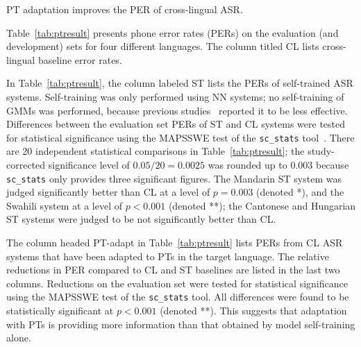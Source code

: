 
PT adaptation improves the PER of cross-lingual ASR.

Table~\ref{tab:ptresult} presents phone error rates (PERs) on the
evaluation (and development) sets for four different languages. The
column titled {\sc CL} lists cross-lingual baseline error rates.

In Table~\ref{tab:ptresult}, the column labeled {\sc ST} lists the
PERs of self-trained ASR systems. Self-training was only performed
using NN systems; no self-training of GMMs was performed, because
previous studies~\cite{Huang2013} reported it to be less effective.
Differences between the evaluation set PERs of {\sc ST} and {\sc CL}
systems were tested for statistical significance using the MAPSSWE
test of the {\tt sc\_stats} tool~\cite{Pallet90}.  There are 20
independent statistical comparisons in Table~\ref{tab:ptresult}; the
study-corrected significance level of $0.05/20=0.0025$ was rounded up
to $0.003$ because {\tt sc\_stats} only provides three significant
figures.  The Mandarin {\sc ST} system was judged significantly better
than {\sc CL} at a level of $p=0.003$ (denoted *), and the Swahili
system at a level of $p<0.001$ (denoted **); the Cantonese and
Hungarian {\sc ST} systems were judged to be not significantly better
than {\sc CL}.

The column headed {\sc PT-adapt} in Table~\ref{tab:ptresult} lists
PERs from {\sc CL} ASR systems that have been adapted to PTs in the target
language.
The relative reductions in PER compared to {\sc CL} and {\sc ST} baselines
are listed in the last two columns.  Reductions on the evaluation set
were tested for statistical significance using the MAPSSWE test of the
{\tt sc\_stats} tool.  All differences were found to be statistically
significant at $p<0.001$ (denoted **).  This suggests that adaptation
with PTs is providing more information than that obtained by model
self-training alone.


